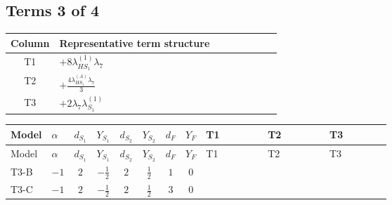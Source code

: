 \documentclass[8pt]{article}
\begin{document}
\begin{landscape}
\subsection*{Terms 3 of 4}
\begin{center}
\begin{tabular}{@{}c >{\raggedright\arraybackslash}p{0.82\linewidth}@{}}
\toprule
Column & Representative term structure \\
\midrule
T1 & \(\displaystyle +8 {\lambda_{HS_1}^{(1)}} {\lambda_7}\) \\
\midrule
T2 & \(\displaystyle +\frac{4 {\lambda_{HS_1}^{(A)}} {\lambda_7}}{3}\) \\
\midrule
T3 & \(\displaystyle +2 {\lambda_7} {\lambda_{S_1}^{(1)}}\) \\
\midrule
\bottomrule
\end{tabular}
\end{center}
\smallskip
\tiny
\begin{longtable}{@{}llcccccc >{\raggedright\arraybackslash}p{0.21\linewidth} >{\raggedright\arraybackslash}p{0.21\linewidth} >{\raggedright\arraybackslash}p{0.21\linewidth}@{}}
\toprule
Model & $\alpha$ & $d_{S_1}$ & $Y_{S_1}$ & $d_{S_2}$ & $Y_{S_2}$ & $d_F$ & $Y_F$ & T1 & T2 & T3 \\
\midrule
\endfirsthead
\toprule
Model & $\alpha$ & $d_{S_1}$ & $Y_{S_1}$ & $d_{S_2}$ & $Y_{S_2}$ & $d_F$ & $Y_F$ & T1 & T2 & T3 \\
\midrule
\endhead
T3-B & $-1$ & $2$ & $-\frac{1}{2}$ & $2$ & $\frac{1}{2}$ & $1$ & $0$ & \scriptsize\adjustbox{max width=\linewidth}{$\begin{gathered} +8 {\lambda_{HS_1}^{(1)}} {\lambda_7}\end{gathered}$} & \scriptsize\adjustbox{max width=\linewidth}{$\begin{gathered} +\frac{4 {\lambda_{HS_1}^{(A)}} {\lambda_7}}{3}\end{gathered}$} & \scriptsize\adjustbox{max width=\linewidth}{$\begin{gathered} +2 {\lambda_7} {\lambda_{S_1}^{(1)}}\end{gathered}$} \\
\midrule
T3-C & $-1$ & $2$ & $-\frac{1}{2}$ & $2$ & $\frac{1}{2}$ & $3$ & $0$ & \scriptsize\adjustbox{max width=\linewidth}{$\begin{gathered} +8 {\lambda_{HS_1}^{(1)}} {\lambda_7}\end{gathered}$} & \scriptsize\adjustbox{max width=\linewidth}{$\begin{gathered} +\frac{4 {\lambda_{HS_1}^{(A)}} {\lambda_7}}{3}\end{gathered}$} & \scriptsize\adjustbox{max width=\linewidth}{$\begin{gathered} +2 {\lambda_7} {\lambda_{S_1}^{(1)}}\end{gathered}$} \\

\end{longtable}
\end{landscape}
\end{document}
